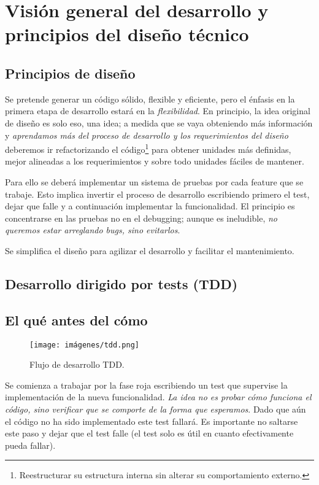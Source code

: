 
\section{Visión general del desarrollo y principios del diseño técnico}\label{principios:vision-general-desarrollo}

\subsection{Principios de diseño}\label{principios:principios-de-diseno}
Se pretende generar un código sólido, flexible y eficiente, pero el énfasis en la primera etapa de desarrollo estará en la \emph{flexibilidad}. En principio, la idea original de diseño es solo eso, una idea; a medida que se vaya obteniendo más información y \emph{aprendamos más del proceso de desarrollo y los requerimientos del diseño} deberemos ir refactorizando el código\footnote{Reestructurar su estructura interna sin alterar su comportamiento externo.} para obtener unidades más definidas, mejor alineadas a los requerimientos y sobre todo unidades fáciles de mantener.

Para ello se deberá implementar un sistema de pruebas por cada feature que se trabaje. Esto implica invertir el proceso de desarrollo escribiendo primero el test, dejar que falle y a continuación implementar la funcionalidad. El principio es concentrarse en las pruebas no en el \foreignlanguage{english}{debugging}; aunque es ineludible, \emph{no queremos estar arreglando bugs, sino evitarlos}.

Se simplifica el diseño para agilizar el desarrollo y facilitar el mantenimiento.

\subsection{Desarrollo dirigido por tests (TDD)}\label{principios:TDD}
\subsection*{El qué antes del cómo}

\begin{figure}[ht]
	\centering
	\texttt{[image: imágenes/tdd.png]}
	\caption{Flujo de desarrollo TDD.}
\end{figure}

Se comienza a trabajar por la fase roja escribiendo un test que supervise la implementación de la nueva funcionalidad. \emph{La idea no es probar cómo funciona el código, sino verificar que se comporte de la forma que esperamos}. Dado que aún el código no ha sido implementado este test fallará. Es importante no saltarse este paso y dejar que el test falle (el test solo es útil en cuanto efectivamente pueda fallar).

